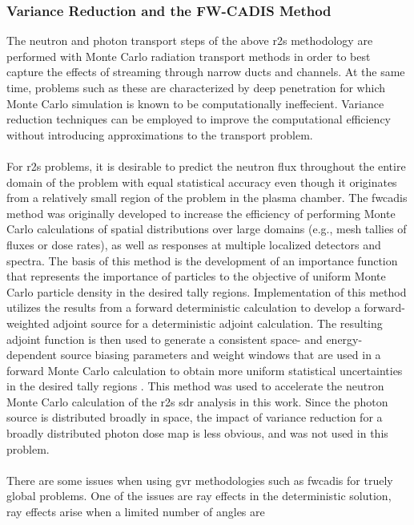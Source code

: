 \documentclass[12pt]{article}
\begin{document}
\subsubsection{Variance Reduction and the FW-CADIS Method}
The neutron and photon transport steps of the above \gls{r2s} methodology are
performed with Monte Carlo radiation transport methods in order to best
capture the effects of streaming through narrow ducts and channels.  At the
same time, problems such as these are characterized by deep penetration for
which Monte Carlo simulation is known to be computationally ineffecient.
Variance reduction techniques can be employed to improve the computational
efficiency without introducing approximations to the transport problem.
\\
\\
For \gls{r2s} problems, it is desirable to predict the neutron flux throughout
the entire domain of the problem with equal statistical accuracy even though
it originates from a relatively small region of the problem in the plasma
chamber.  The \gls{fwcadis} method was originally developed to increase the
efficiency of performing Monte Carlo calculations of spatial distributions
over large domains (e.g., mesh tallies of fluxes or dose rates), as well as
responses at multiple localized detectors and spectra. The basis of this
method is the development of an importance function that represents the
importance of particles to the objective of uniform Monte Carlo particle
density in the desired tally regions.  Implementation of this method utilizes
the results from a forward deterministic calculation to develop a
forward-weighted adjoint source for a deterministic adjoint calculation. The
resulting adjoint function is then used to generate a consistent space- and
energy-dependent source biasing parameters and weight windows that are used in
a forward Monte Carlo calculation to obtain more uniform statistical
uncertainties in the desired tally regions \cite{wagnerNSEFWCADIS}. This
method was used to accelerate the neutron Monte Carlo calculation of
the \gls{r2s} \gls{sdr} analysis in this work. Since the photon source is
distributed broadly in space, the impact of variance reduction for a broadly
distributed photon dose map is less obvious, and was not used in this problem.
\\
\\
There are some issues when using \gls{gvr} methodologies such as \gls{fwcadis}
for truely global problems. One of the issues are ray effects in the 
deterministic solution, ray effects arise when a limited number of angles are 
\end{document}
